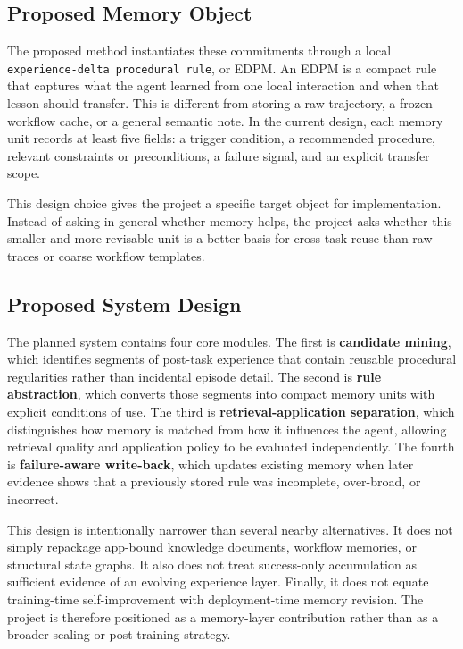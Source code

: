 \documentclass{article}
\begin{document}
\subsection{Proposed Memory Object}\label{82-proposed-memory-object}

The proposed method instantiates these commitments through a local
\texttt{experience-delta\ procedural\ rule}, or EDPM. An EDPM is a
compact rule that captures what the agent learned from one local
interaction and when that lesson should transfer. This is different from
storing a raw trajectory, a frozen workflow cache, or a general semantic
note. In the current design, each memory unit records at least five
fields: a trigger condition, a recommended procedure, relevant
constraints or preconditions, a failure signal, and an explicit transfer
scope.

This design choice gives the project a specific target object for
implementation. Instead of asking in general whether memory helps, the
project asks whether this smaller and more revisable unit is a better
basis for cross-task reuse than raw traces or coarse workflow templates.

\subsection{Proposed System Design}\label{83-proposed-system-design}

The planned system contains four core modules. The first is
\textbf{candidate mining}, which identifies segments of post-task
experience that contain reusable procedural regularities rather than
incidental episode detail. The second is \textbf{rule abstraction},
which converts those segments into compact memory units with explicit
conditions of use. The third is
\textbf{retrieval-application separation}, which distinguishes how
memory is matched from how it influences the agent, allowing retrieval
quality and application policy to be evaluated independently. The fourth
is \textbf{failure-aware write-back}, which updates existing memory when
later evidence shows that a previously stored rule was incomplete,
over-broad, or incorrect.

This design is intentionally narrower than several nearby alternatives.
It does not simply repackage app-bound knowledge documents, workflow
memories, or structural state graphs. It also does not treat
success-only accumulation as sufficient evidence of an evolving
experience layer. Finally, it does not equate training-time
self-improvement with deployment-time memory revision. The project is
therefore positioned as a memory-layer contribution rather than as a
broader scaling or post-training strategy.
\end{document}
